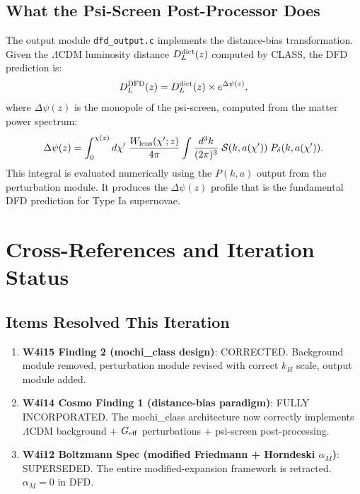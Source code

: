 \documentclass[11pt]{article}
\theoremstyle{definition}
\theoremstyle{remark}
\newcommand{\Geff}{G_{\rm eff}}
\newcommand{\LCDM}{$\Lambda$CDM}
\newcommand{\Dpsi}{\Delta\psi}
\begin{document}
\subsection{What the Psi-Screen Post-Processor Does}

The output module \texttt{dfd\_output.c} implements the distance-bias
transformation. Given the \LCDM{} luminosity distance $D_L^{\rm dict}(z)$
computed by CLASS, the DFD prediction is:
\begin{equation}
  D_L^{\rm DFD}(z) = D_L^{\rm dict}(z) \times e^{\Dpsi(z)},
\end{equation}
where $\Dpsi(z)$ is the monopole of the psi-screen, computed from the
matter power spectrum:
\begin{equation}
  \Dpsi(z) = \int_0^{\chi(z)} d\chi'\;
  \frac{W_{\rm lens}(\chi';z)}{4\pi}
  \int \frac{d^3k}{(2\pi)^3}\; \mathcal{S}(k,a(\chi'))\;
  P_\delta(k, a(\chi')).
  \label{eq:dpsi-integral}
\end{equation}
This integral is evaluated numerically using the $P(k,a)$ output from
the perturbation module. It produces the $\Dpsi(z)$ profile that is
the fundamental DFD prediction for Type Ia supernovae.


\section{Cross-References and Iteration Status}
\label{sec:cross-ref}

\subsection{Items Resolved This Iteration}

\begin{enumerate}
\item \textbf{W4i15 Finding 2 (mochi\_class design)}: CORRECTED.
  Background module removed, perturbation module revised with correct
  $k_H$ scale, output module added.

\item \textbf{W4i14 Cosmo Finding 1 (distance-bias paradigm)}:
  FULLY INCORPORATED. The mochi\_class architecture now correctly
  implements \LCDM{} background + $\Geff$ perturbations + psi-screen
  post-processing.

\item \textbf{W4i12 Boltzmann Spec (modified Friedmann + Horndeski
  $\alpha_M$)}: SUPERSEDED. The entire modified-expansion framework
  is retracted. $\alpha_M = 0$ in DFD.
\end{enumerate}
\end{document}
